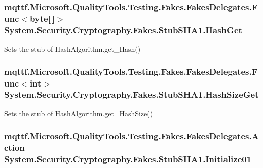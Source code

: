\hypertarget{class_system_1_1_security_1_1_cryptography_1_1_fakes_1_1_stub_s_h_a1_aeefab4ed3f1ba70a2a4fe3e9c1de6d7a}{
\subsubsection[{Hash\-Get}]{\setlength{\rightskip}{0pt plus 5cm}mqttf.\-Microsoft.\-Quality\-Tools.\-Testing.\-Fakes.\-Fakes\-Delegates.\-Func$<$byte\mbox{[}$\,$\mbox{]}$>$ System.\-Security.\-Cryptography.\-Fakes.\-Stub\-S\-H\-A1.\-Hash\-Get}}\label{class_system_1_1_security_1_1_cryptography_1_1_fakes_1_1_stub_s_h_a1_aeefab4ed3f1ba70a2a4fe3e9c1de6d7a}


Sets the stub of Hash\-Algorithm.\-get\-\_\-\-Hash()

\hypertarget{class_system_1_1_security_1_1_cryptography_1_1_fakes_1_1_stub_s_h_a1_ad4840200d1fb0a391dc28002e0225c6e}{
\subsubsection[{Hash\-Size\-Get}]{\setlength{\rightskip}{0pt plus 5cm}mqttf.\-Microsoft.\-Quality\-Tools.\-Testing.\-Fakes.\-Fakes\-Delegates.\-Func$<$int$>$ System.\-Security.\-Cryptography.\-Fakes.\-Stub\-S\-H\-A1.\-Hash\-Size\-Get}}\label{class_system_1_1_security_1_1_cryptography_1_1_fakes_1_1_stub_s_h_a1_ad4840200d1fb0a391dc28002e0225c6e}


Sets the stub of Hash\-Algorithm.\-get\-\_\-\-Hash\-Size()

\hypertarget{class_system_1_1_security_1_1_cryptography_1_1_fakes_1_1_stub_s_h_a1_aa639f9742b4e8c7b447bb2861850972c}{
\subsubsection[{Initialize01}]{\setlength{\rightskip}{0pt plus 5cm}mqttf.\-Microsoft.\-Quality\-Tools.\-Testing.\-Fakes.\-Fakes\-Delegates.\-Action System.\-Security.\-Cryptography.\-Fakes.\-Stub\-S\-H\-A1.\-Initialize01}}\label{class_system_1_1_security_1_1_cryptography_1_1_fakes_1_1_stub_s_h_a1_aa639f9742b4e8c7b447bb2861850972c}


